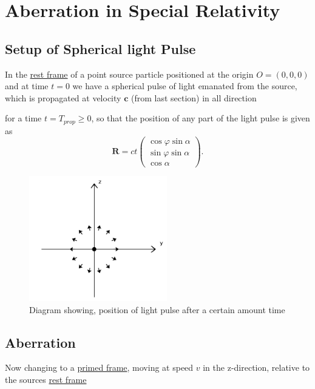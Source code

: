 \section{Aberration in Special Relativity}
\subsection{Setup of Spherical light Pulse}

In the \hyperlink{def-proper-frame}{rest frame} of a point source particle positioned at the origin $O = (0,0,0)$ and at time $t=0$ we have a spherical pulse of light emanated from the source, which is propagated at velocity $\mathbf{c}$ (from last section) in all direction

for a time $t=T_{prop} \geq 0$, so that the position of any part of the light pulse is given as
\begin{equation}%
	\label{displacement: proper pulse}
	\mathbf{R} =  c t
	\begin{pmatrix}
		\cos{\varphi}\sin{\alpha} \\ \sin{\varphi}\sin{\alpha} \\ \cos{\alpha}
	\end{pmatrix}.
\end{equation}%

\begin{figure}[ht]
	\centering
	\includegraphics[width=6cm]{images/pdf/Rest_Pulse.pdf}
	\caption{Diagram showing, position of light pulse after a certain amount time}
	\label{fig: Rest Pulse}
\end{figure}

\subsection{Aberration}

Now changing to a \hyperlink{def-Primed-Frame}{primed frame}, moving at speed $v$ in the z-direction, relative to the sources \hyperlink{def-proper-frame}{rest frame}

